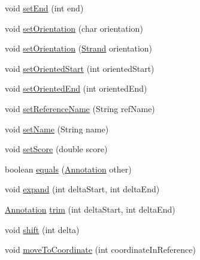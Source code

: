 \begin{DoxyCompactItemize}
\item 
void \hyperlink{interfaceumms_1_1core_1_1annotation_1_1_annotation_a149e821da8f19e0fad6c3a52edf61728}{set\+End} (int end)
\item 
void \hyperlink{interfaceumms_1_1core_1_1annotation_1_1_annotation_ad919607886c5447f5af908b286fba3ad}{set\+Orientation} (char orientation)
\item 
void \hyperlink{interfaceumms_1_1core_1_1annotation_1_1_annotation_a23c9bf453b4bbc76f6b50e78cd73aa75}{set\+Orientation} (\hyperlink{enumumms_1_1core_1_1annotation_1_1_annotation_1_1_strand}{Strand} orientation)
\item 
void \hyperlink{interfaceumms_1_1core_1_1annotation_1_1_annotation_a6529e3f5bc1531639fe663f8ee5c0be2}{set\+Oriented\+Start} (int oriented\+Start)
\item 
void \hyperlink{interfaceumms_1_1core_1_1annotation_1_1_annotation_a609c582828b96300a6ae44332c17a8e8}{set\+Oriented\+End} (int oriented\+End)
\item 
void \hyperlink{interfaceumms_1_1core_1_1annotation_1_1_annotation_aa6ddff9a7f3bcff152914299092545ff}{set\+Reference\+Name} (String ref\+Name)
\item 
void \hyperlink{interfaceumms_1_1core_1_1annotation_1_1_annotation_a91fac76eec98277eca2e0a12d4b4fe77}{set\+Name} (String name)
\item 
void \hyperlink{interfaceumms_1_1core_1_1annotation_1_1_annotation_aa46bc7126d4e5f9df374c6525cfcee14}{set\+Score} (double score)
\item 
boolean \hyperlink{interfaceumms_1_1core_1_1annotation_1_1_annotation_a0515e1f20b4e9e913b4f7f329a6c11ad}{equals} (\hyperlink{interfaceumms_1_1core_1_1annotation_1_1_annotation}{Annotation} other)
\item 
void \hyperlink{interfaceumms_1_1core_1_1annotation_1_1_annotation_a66539fdbe07eb71d3a16d707250f5b60}{expand} (int delta\+Start, int delta\+End)
\item 
\hyperlink{interfaceumms_1_1core_1_1annotation_1_1_annotation}{Annotation} \hyperlink{interfaceumms_1_1core_1_1annotation_1_1_annotation_a5542af76653dcba00bf9484a08039a3c}{trim} (int delta\+Start, int delta\+End)
\item 
void \hyperlink{interfaceumms_1_1core_1_1annotation_1_1_annotation_a3014cb6c724297b8bbccabaffff4bb3a}{shift} (int delta)
\item 
void \hyperlink{interfaceumms_1_1core_1_1annotation_1_1_annotation_aac56df2b60a55cc3d7615ec372584462}{move\+To\+Coordinate} (int coordinate\+In\+Reference)

\end{DoxyCompactItemize}
